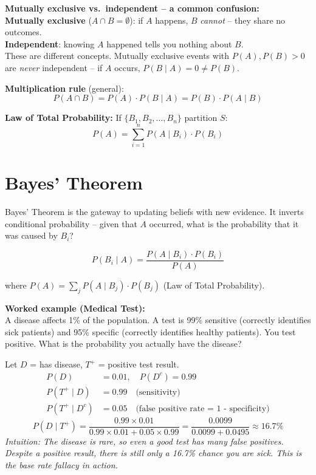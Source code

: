 \documentclass[11pt, letterpaper]{article}
\begin{document}
\begin{tcolorbox}[colback=notebg, colframe=noteborder, arc=3pt, boxrule=1pt]
\textbf{Mutually exclusive vs.\ independent -- a common confusion:}\\
\textbf{Mutually exclusive} ($A \cap B = \emptyset$): if $A$ happens, $B$ \emph{cannot} -- they share no outcomes.\\
\textbf{Independent}: knowing $A$ happened tells you nothing about $B$.\\
These are different concepts. Mutually exclusive events with $P(A), P(B) > 0$ are \emph{never} independent -- if $A$ occurs, $P(B \mid A) = 0 \neq P(B)$.
\end{tcolorbox}

\textbf{Multiplication rule} (general):
\[
  P(A \cap B) = P(A) \cdot P(B \mid A) = P(B) \cdot P(A \mid B)
\]

\textbf{Law of Total Probability:} If $\{B_1, B_2, \ldots, B_n\}$ partition $S$:
\[
  P(A) = \sum_{i=1}^{n} P(A \mid B_i) \cdot P(B_i)
\]

\section*{Bayes' Theorem}

Bayes' Theorem is the gateway to updating beliefs with new evidence. It inverts conditional probability -- given that $A$ occurred, what is the probability that it was caused by $B_i$?

\[
  \boxed{P(B_i \mid A) = \frac{P(A \mid B_i) \cdot P(B_i)}{P(A)}}
\]

where $P(A) = \sum_j P(A \mid B_j) \cdot P(B_j)$ (Law of Total Probability).

\begin{tcolorbox}[colback=part3bg, colframe=sectionpurple, arc=3pt, boxrule=1pt]
\textbf{Worked example (Medical Test):}\\
A disease affects 1\% of the population. A test is 99\% sensitive (correctly identifies sick patients) and 95\% specific (correctly identifies healthy patients). You test positive. What is the probability you actually have the disease?

Let $D$ = has disease, $T^+$ = positive test result.
\begin{align*}
  P(D) &= 0.01, \quad P(D^c) = 0.99 \\
  P(T^+ \mid D) &= 0.99 \quad \text{(sensitivity)} \\
  P(T^+ \mid D^c) &= 0.05 \quad \text{(false positive rate = 1 - specificity)}
\end{align*}
\[
  P(D \mid T^+) = \frac{0.99 \times 0.01}{0.99 \times 0.01 + 0.05 \times 0.99} = \frac{0.0099}{0.0099 + 0.0495} \approx \mathbf{16.7\%}
\]
\textit{Intuition: The disease is rare, so even a good test has many false positives. Despite a positive result, there is still only a 16.7\% chance you are sick. This is the base rate fallacy in action.}
\end{tcolorbox}
\end{document}

